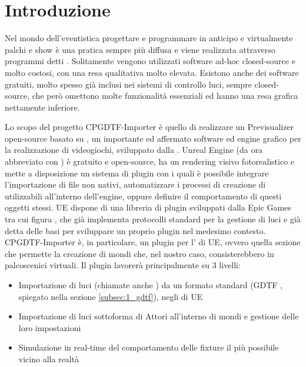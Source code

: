 \documentclass[main.tex]{subfiles}
\begin{document}
\sloppy


\vspace{1.0cm}

\section{Introduzione}\label{sec:Introduzione}
Nel mondo dell'eventistica progettare e programmare in anticipo e virtualmente palchi e show è una pratica sempre più diffusa e viene realizzata attraverso programmi detti . Solitamente vengono utilizzati software\cite{capture} ad-hoc closed-source e molto costosi, con una resa qualitativa molto elevata. Esistono anche dei software gratuiti, molto spesso già inclusi nei sistemi di controllo luci, sempre closed-source, che però omettono molte funzionalità essenziali ed hanno una resa grafica nettamente inferiore.\newline

Lo scopo del progetto CPGDTF-Importer è quello di realizzare un Previsualizer open-source basato su \cite{UnrealEngine}, un importante ed affermato software ed engine grafico per la realizzazione di videogiochi, sviluppato dalla . Unreal Engine (da ora abbreviato con ) è gratuito e open-source, ha un rendering visivo fotorealistico e mette a disposizione un sistema di plugin con i quali è possibile integrare l'importazione di file non nativi, automatizzare i processi di creazione di  utilizzabili all'interno dell'engine, oppure definire il comportamento di questi oggetti stessi. UE dispone di una libreria di plugin sviluppati dalla Epic Games tra cui figura , che già implementa protocolli standard per la gestione di luci e già detta delle basi per sviluppare un proprio plugin nel medesimo contesto.  
\newline
CPGDTF-Importer è, in particolare, un plugin per l' di UE, ovvero quella sezione che permette la creazione di mondi che, nel nostro caso, consisterebbero in palcoscenici virtuali. Il plugin lavorerà principalmente su 3 livelli:
\begin{itemize}
    \item Importazione di luci (chiamate anche ) da un formato standard (GDTF \cite{GDTF}, spiegato nella sezione \ref{subsec:1_gdtf}), negli  di UE
    \item Importazione di luci sottoforma di Attori all'interno di mondi e gestione delle loro impostazioni
    \item Simulazione in real-time del comportamento delle fixture il più possibile vicino alla realtà
\end{itemize}
\end{document}
